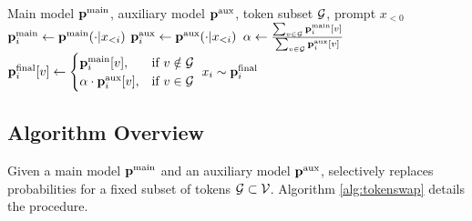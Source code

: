 \begin{algorithm}[t]
\caption{\sys}
\label{alg:tokenswap}
\begin{algorithmic}[1]
\REQUIRE Main model \(\mathbf{p}^{\text{main}}\), auxiliary model \(\mathbf{p}^{\text{aux}}\), token subset \(\mathcal{G}\), prompt \(x_{<0}\)
    \STATE \(\mathbf{p}^{\text{main}}_i \gets \mathbf{p}^{\text{main}}(\cdot | x_{<i})\) 
    \STATE \(\mathbf{p}^{\text{aux}}_i \gets \mathbf{p}^{\text{aux}}(\cdot | x_{<i})\) 
    \STATE \(\alpha \gets \frac{\sum_{v \in \mathcal{G}} \mathbf{p}^{\text{main}}_i[v]}{\sum_{v \in \mathcal{G}} \mathbf{p}^{\text{aux}}_i[v]}\) 
        \STATE \(\mathbf{p}^{\text{final}}_i[v] \gets \begin{cases}
            \mathbf{p}^{\text{main}}_i[v], & \text{if } v \notin \mathcal{G} \\
            \alpha \cdot \mathbf{p}^{\text{aux}}_i[v], & \text{if } v \in \mathcal{G}
        \end{cases}\)
    \ENDFOR
    \STATE \(x_i \sim \mathbf{p}^{\text{final}}_i\) 
\ENDFOR
\end{algorithmic}
\end{algorithm}


\subsection{Algorithm Overview}
\label{subsec:proposed_algorithm}
Given a main model \(\mathbf{p}^{\text{main}}\) and an auxiliary model \(\mathbf{p}^{\text{aux}}\), \sys selectively replaces probabilities for a fixed subset of tokens \(\mathcal{G} \subset \mathcal{V}\). Algorithm \ref{alg:tokenswap} details the procedure.



